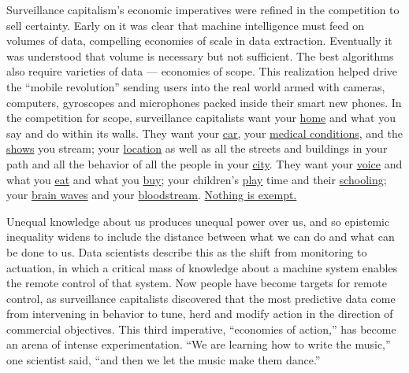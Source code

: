 Surveillance capitalism's economic imperatives were refined in the
competition to sell certainty. Early on it was clear that machine
intelligence must feed on volumes of data, compelling economies of scale
in data extraction. Eventually it was understood that volume is
necessary but not sufficient. The best algorithms also require varieties
of data --- economies of scope. This realization helped drive the
``mobile revolution'' sending users into the real world armed with
cameras, computers, gyroscopes and microphones packed inside their smart
new phones. In the competition for scope, surveillance capitalists want
your
\href{https://moniotrlab.ccis.neu.edu/wp-content/uploads/2019/09/ren-imc19.pdf}{home}
and what you say and do within its walls. They want your
\href{https://www.washingtonpost.com/technology/2019/12/17/what-does-your-car-know-about-you-we-hacked-chevy-find-out/}{car,}
your
\href{https://www.nytimes.com/2019/11/11/business/google-ascension-health-data.html}{medical
conditions}, and the
\href{https://tv-watches-you.princeton.edu/tv-tracking-acm-ccs19.pdf}{shows}
you stream; your
\href{https://www.nytimes.com/interactive/2019/12/19/opinion/location-tracking-cell-phone.html}{location}
as well as all the streets and buildings in your path and all the
behavior of all the people in your
\href{https://papers.ssrn.com/sol3/papers.cfm?abstract_id=3390610}{city}.
They want your
\href{https://arstechnica.com/gadgets/2019/02/googles-nest-security-system-shipped-with-a-secret-microphone/}{voice}
and what you
\href{https://www.winsightgrocerybusiness.com/retailers/real-time-insights-amazon-prime-whole-foods-integration}{eat}
and what you
\href{https://www.fastcompany.com/90349518/google-keeps-an-eye-on-what-you-buy-and-its-not-alone}{buy};
your children's
\href{https://www.cnet.com/news/parents-told-to-destroy-connected-dolls-over-hacking-fears/}{play}
time and their
\href{https://www.wsj.com/articles/one-parent-is-on-a-mission-to-protect-children-from-digital-mistakes-11562762000}{schooling};
your
\href{https://www.vox.com/2019/8/30/20835137/facebook-zuckerberg-elon-musk-brain-mind-reading-neuroethics}{brain
waves} and your
\href{https://slate.com/technology/2019/09/social-determinants-health-facebook-google.html}{bloodstream}.
\href{https://www.seattletimes.com/business/amazon/amazon-rolls-out-new-devices-amid-swirl-of-privacy-questions/}{Nothing
is exempt.}

Unequal knowledge about us produces unequal power over us, and so
epistemic inequality widens to include the distance between what we can
do and what can be done to us. Data scientists describe this as the
shift from monitoring to actuation, in which a critical mass of
knowledge about a machine system enables the remote control of that
system. Now people have become targets for remote control, as
surveillance capitalists discovered that the most predictive data come
from intervening in behavior to tune, herd and modify action in the
direction of commercial objectives. This third imperative, ``economies
of action,'' has become an arena of intense experimentation. ``We are
learning how to write the music,'' one scientist said, ``and then we let
the music make them dance.''


